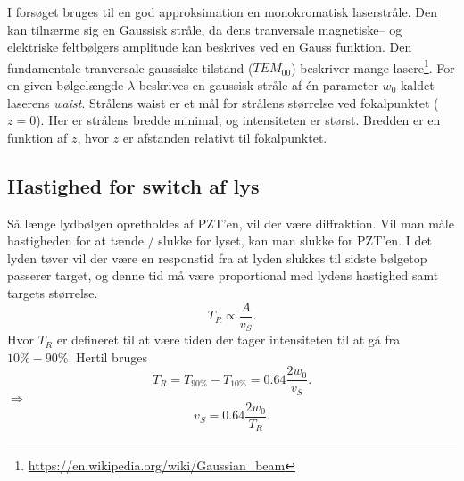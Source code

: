 \documentclass[main]{subfiles}
\begin{document}
I forsøget bruges til en god approksimation en monokromatisk laserstråle. Den kan tilnærme sig en Gaussisk stråle, da dens tranversale magnetiske-- og elektriske feltbølgers amplitude kan beskrives ved en Gauss funktion. Den fundamentale tranversale gaussiske tilstand ($TEM_{00}$) beskriver mange lasere\footnote{\url{https://en.wikipedia.org/wiki/Gaussian_beam}}. For en given bølgelængde $\lambda$ beskrives en gaussisk stråle af én parameter $w_0$ kaldet laserens \emph{waist}. Strålens waist er et mål for strålens størrelse ved fokalpunktet ($z=0$). Her er strålens bredde minimal, og intensiteten er størst. Bredden er en funktion af $z$, hvor $z$ er afstanden relativt til fokalpunktet.

\subsection{Hastighed for switch af lys}
Så længe lydbølgen opretholdes af PZT'en, vil der være diffraktion. Vil man måle hastigheden for at tænde / slukke for lyset, kan man slukke for PZT'en. I det lyden tøver vil der være en responstid fra at lyden slukkes til sidste bølgetop passerer target, og denne tid må være proportional med lydens hastighed samt targets størrelse.
\begin{equation}
    T_R \propto \frac{A}{v_S}.
\end{equation}
Hvor $T_R$ er defineret til at være tiden der tager intensiteten til at gå fra $ 10\% - 90\%$.  Hertil bruges
\begin{equation}
    T_R = T_{90\%} - T_{10\%} = 0.64 \frac{2w_0}{v_S}.
    \label{eq:risetime}
\end{equation}
$\Rightarrow$
\begin{equation} %
    v_S =  0.64 \frac{2w_0}{T_R}.
    \label{eq:risetimeIsolere}
\end{equation}
\end{document}
